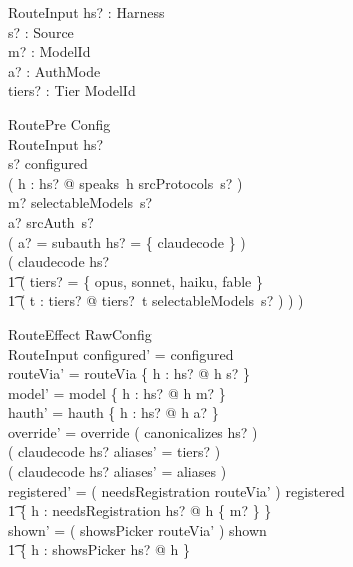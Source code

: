 \documentclass{article}
\begin{document}
\begin{schema}{RouteInput}
	hs? : \power Harness \\
	s? : Source \\
	m? : ModelId \\
	a? : AuthMode \\
	tiers? : Tier \pfun ModelId
\end{schema}

\begin{schema}{RoutePre}
	Config \\
	RouteInput
	\where
	hs? \neq \emptyset \\
	s? \in configured \\
	( \forall h : hs? @ speaks~h \in srcProtocols~s? ) \\
	m? \in selectableModels~s? \\
	a? \in srcAuth~s? \\
	( a? = subauth \implies hs? = \{ claudecode \} ) \\
	( claudecode \in hs? \implies \\
	\t1 ( \dom tiers? = \{ opus, sonnet, haiku, fable \} \land \\
	\t1   ( \forall t : \dom tiers? @ tiers?~t \in selectableModels~s? ) ) )
\end{schema}

\begin{schema}{RouteEffect}
	\Delta RawConfig \\
	RouteInput
	\where
	configured' = configured \\
	routeVia' = routeVia \oplus \{ h : hs? @ h \mapsto s? \} \\
	model' = model \oplus \{ h : hs? @ h \mapsto m? \} \\
	hauth' = hauth \oplus \{ h : hs? @ h \mapsto a? \} \\
	override' = override \cup ( canonicalizes \cap hs? ) \\
	( claudecode \in hs? \implies aliases' = tiers? ) \\
	( claudecode \notin hs? \implies aliases' = aliases ) \\
	registered' = ( needsRegistration \cap \dom routeVia' ) \dres registered \\
	\t1 \oplus \{ h : needsRegistration \cap hs? @ h \mapsto \{ m? \} \} \\
	shown' = ( showsPicker \cap \dom routeVia' ) \dres shown \\
	\t1 \oplus \{ h : showsPicker \cap hs? @ h \mapsto \emptyset \}
\end{schema}
\end{document}
